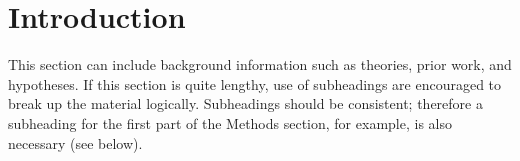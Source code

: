\section{Introduction}
This section can include background information such as theories, prior work, and hypotheses. 
If this section is quite lengthy, use of subheadings are encouraged to break up the material logically. Subheadings should be consistent; therefore a subheading for the first part of the Methods section, for example, is also necessary (see below).
